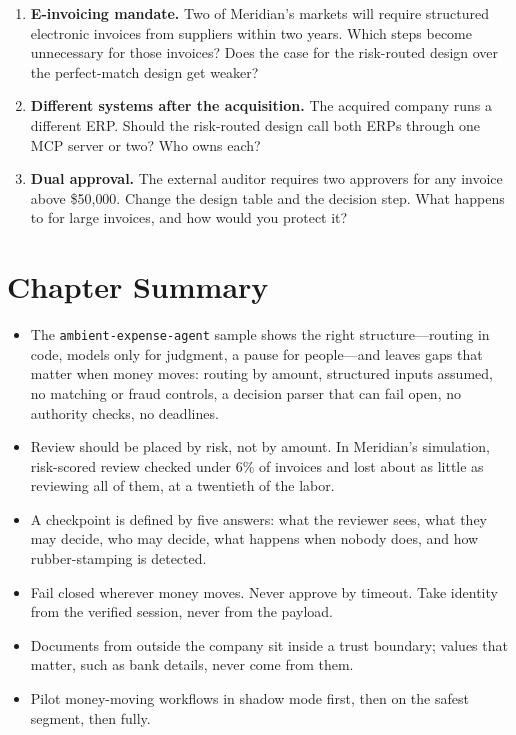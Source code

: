 \begin{enumerate}[itemsep=3pt]
  \item \textbf{E-invoicing mandate.} Two of Meridian's markets will require structured electronic invoices from suppliers within two years. Which steps become unnecessary for those invoices? Does the case for the risk-routed design over the perfect-match design get weaker?
  \item \textbf{Different systems after the acquisition.} The acquired company runs a different ERP. Should the risk-routed design call both ERPs through one MCP server or two? Who owns each?
  \item \textbf{Dual approval.} The external auditor requires two approvers for any invoice above \$50{,}000. Change the design table and the decision step. What happens to  for large invoices, and how would you protect it?
\end{enumerate}

\section*{Chapter Summary}

\begin{itemize}[itemsep=2pt]
  \item The \texttt{ambient-expense-agent} sample shows the right structure---routing in code, models only for judgment, a pause for people---and leaves gaps that matter when money moves: routing by amount, structured inputs assumed, no matching or fraud controls, a decision parser that can fail open, no authority checks, no deadlines.
  \item Review should be placed by risk, not by amount. In Meridian's simulation, risk-scored review checked under 6\% of invoices and lost about as little as reviewing all of them, at a twentieth of the labor.
  \item A checkpoint is defined by five answers: what the reviewer sees, what they may decide, who may decide, what happens when nobody does, and how rubber-stamping is detected.
  \item Fail closed wherever money moves. Never approve by timeout. Take identity from the verified session, never from the payload.
  \item Documents from outside the company sit inside a trust boundary; values that matter, such as bank details, never come from them.
  \item Pilot money-moving workflows in shadow mode first, then on the safest segment, then fully.
\end{itemize}


